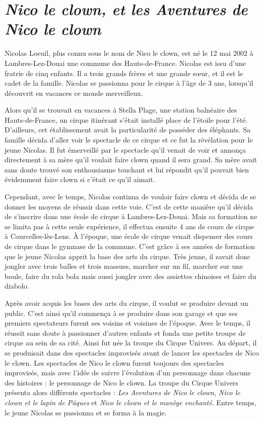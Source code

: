 \section*{\textit{Nico le clown, et les Aventures de Nico le clown}}
{}

Nicolas Loeuil, plus connu sous le nom de Nico le clown, est né le 12 mai 2002 à Lambres-Lez-Douai une commune des Hauts-de-France. Nicolas est issu d’une fratrie de cinq enfants. Il a trois grands frères et une grande sœur, et il est le cadet de la famille. Nicolas se passionna pour le cirque à l’âge de 3 ans, lorsqu’il découvrit en vacances ce monde merveilleux.

Alors qu’il se trouvait en vacances à Stella Plage, une station balnéaire des Hauts-de-France, un cirque itinérant s’était installé place de l’étoile pour l’été. D'ailleurs, cet établissement avait la particularité de posséder des éléphants. Sa famille décida d'aller voir le spectacle de ce cirque et ce fut la révélation pour le jeune Nicolas. Il fut émerveillé par le spectacle qu’il venait de voir et annonça directement à sa mère qu’il voulait faire clown quand il sera grand. Sa mère avait sans doute trouvé son enthousiasme touchant et lui répondit qu’il pouvait bien évidemment faire clown si c’était ce qu’il aimait.  

Cependant, avec le temps, Nicolas continua de vouloir faire clown et décida de se donner les moyens de réussir dans cette voie. C’est de cette manière qu’il décida de s’inscrire dans une école de cirque à Lambres-Lez-Douai. Mais sa formation ne se limita pas à cette seule expérience, il effectua ensuite 4 ans de cours de cirque à Courcelles-lès-Lens. À l’époque, une école de cirque venait dispenser des cours de cirque dans le gymnase de la commune. C’est grâce à ses années de formation que le jeune Nicolas apprit la base des arts du cirque. Très jeune, il savait donc jongler avec trois balles et trois massues, marcher sur un fil, marcher sur une boule, faire du rola bola mais aussi jongler avec des assiettes chinoises et faire du diabolo.

Après avoir acquis les bases des arts du cirque, il voulut se produire devant un public. C’est ainsi qu’il commença à se produire dans son garage et que ses premiers spectateurs furent ses voisins et voisines de l’époque. Avec le temps, il réussit sans doute à passionner d’autres enfants et fonda une petite troupe de cirque au sein de sa cité. Ainsi fut née la troupe du Cirque Univers. Au départ, il se produisait dans des spectacles improvisés avant de lancer les spectacles de Nico le clown. Les spectacles de Nico le clown furent toujours des spectacles improvisés, mais avec l'idée de suivre l’évolution d’un personnage dans chacune des histoires : le personnage de Nico le clown. La troupe du Cirque Univers présenta alors différents spectacles : \textit{Les Aventures de Nico le clown}, \textit{Nico le clown et le lapin de Pâques} et \textit{Nico le clown et le manège enchanté}. Entre temps, le jeune Nicolas se passionna et se forma à la magie.


